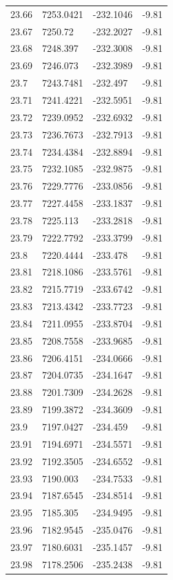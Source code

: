 \begin{table}[H]
\begin{tabular}{llll}
23.66 & 7253.0421 & -232.1046 & -9.81 \\
23.67 & 7250.72 & -232.2027 & -9.81 \\
23.68 & 7248.397 & -232.3008 & -9.81 \\
23.69 & 7246.073 & -232.3989 & -9.81 \\
23.7 & 7243.7481 & -232.497 & -9.81 \\
23.71 & 7241.4221 & -232.5951 & -9.81 \\
23.72 & 7239.0952 & -232.6932 & -9.81 \\
23.73 & 7236.7673 & -232.7913 & -9.81 \\
23.74 & 7234.4384 & -232.8894 & -9.81 \\
23.75 & 7232.1085 & -232.9875 & -9.81 \\
23.76 & 7229.7776 & -233.0856 & -9.81 \\
23.77 & 7227.4458 & -233.1837 & -9.81 \\
23.78 & 7225.113 & -233.2818 & -9.81 \\
23.79 & 7222.7792 & -233.3799 & -9.81 \\
23.8 & 7220.4444 & -233.478 & -9.81 \\
23.81 & 7218.1086 & -233.5761 & -9.81 \\
23.82 & 7215.7719 & -233.6742 & -9.81 \\
23.83 & 7213.4342 & -233.7723 & -9.81 \\
23.84 & 7211.0955 & -233.8704 & -9.81 \\
23.85 & 7208.7558 & -233.9685 & -9.81 \\
23.86 & 7206.4151 & -234.0666 & -9.81 \\
23.87 & 7204.0735 & -234.1647 & -9.81 \\
23.88 & 7201.7309 & -234.2628 & -9.81 \\
23.89 & 7199.3872 & -234.3609 & -9.81 \\
23.9 & 7197.0427 & -234.459 & -9.81 \\
23.91 & 7194.6971 & -234.5571 & -9.81 \\
23.92 & 7192.3505 & -234.6552 & -9.81 \\
23.93 & 7190.003 & -234.7533 & -9.81 \\
23.94 & 7187.6545 & -234.8514 & -9.81 \\
23.95 & 7185.305 & -234.9495 & -9.81 \\
23.96 & 7182.9545 & -235.0476 & -9.81 \\
23.97 & 7180.6031 & -235.1457 & -9.81 \\
23.98 & 7178.2506 & -235.2438 & -9.81 \\

\end{tabular}
\end{table}
